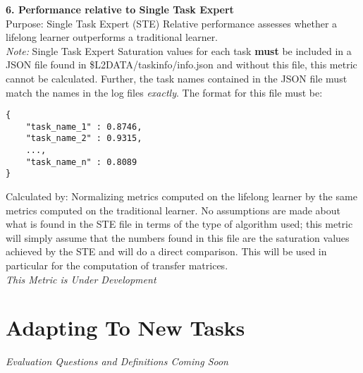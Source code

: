 \textbf{6. Performance relative to Single Task Expert}\\
Purpose: Single Task Expert (STE) Relative performance assesses whether a lifelong learner outperforms a traditional learner.\\
\textit{Note:} Single Task Expert Saturation values for each task \textbf{must} be included in a JSON file found in \$L2DATA/taskinfo/info.json and without this file, this metric cannot be calculated. Further, the task names contained in the JSON file must match the names in the log files \textit{exactly}. The format for this file must be: \\[0.1in]

\begin{small}
\begin{verbatim}
{
    "task_name_1" : 0.8746,
    "task_name_2" : 0.9315,
    ...,
    "task_name_n" : 0.8089
}
\end{verbatim}
\end{small}
Calculated by: Normalizing metrics computed on the lifelong learner by the same metrics computed on the traditional learner. No assumptions are made about what is found in the STE file in terms of the type of algorithm used; this metric will simply assume that the numbers found in this file are the saturation values achieved by the STE and will do a direct comparison. This will be used in particular for the computation of transfer matrices.\\
\textit{This Metric is Under Development}\\[0.1in]

\section{Adapting To New Tasks}

\textit{Evaluation Questions and Definitions Coming Soon}
